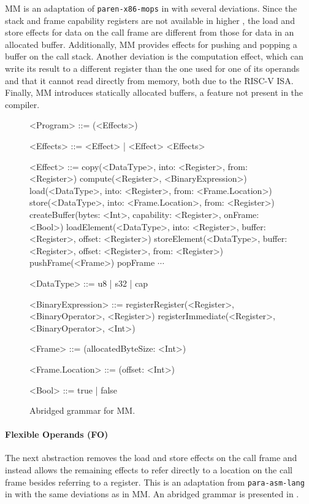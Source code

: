 \documentclass[main.tex]{subfiles}
\begin{document}
MM is an adaptation of \texttt{paren-x86-mops} in \cite{compcourse} with several deviations. Since the stack and frame capability registers are not available in higher \ils{}, the load and store effects for data on the call frame are different from those for data in an allocated buffer. Additionally, MM provides effects for pushing and popping a buffer on the call stack. Another deviation is the computation effect, which can write its result to a different register than the one used for one of its operands and that it cannot read directly from memory, both due to the RISC-V ISA. Finally, MM introduces statically allocated buffers, a feature not present in the \cite{compcourse} compiler.

\begin{figure}[ht]
	\small
	\begin{grammar}
		
		<Program> ::= (<Effects>)
		
		<Effects> ::= <Effect> | <Effect> <Effects>
		
		<Effect> ::= copy(<DataType>, into: <Register>, from: <Register>)
			\alt compute(<Register>, <BinaryExpression>)
			\alt load(<DataType>, into: <Register>, from: <Frame.Location>)
			\alt store(<DataType>, into: <Frame.Location>, from: <Register>)
			\alt createBuffer(bytes: <Int>, capability: <Register>, onFrame: <Bool>)
			\alt loadElement(<DataType>, into: <Register>, buffer: <Register>, offset: <Register>)
			\alt storeElement(<DataType>, buffer: <Register>, offset: <Register>, from: <Register>)
			\alt pushFrame(<Frame>)
			\alt popFrame
			\alt $\cdots$
		
		<DataType> ::= u8 | s32 | cap
		
		<BinaryExpression> ::= registerRegister(<Register>, <BinaryOperator>, <Register>)
			\alt registerImmediate(<Register>, <BinaryOperator>, <Int>)
		
		<Frame> ::= (allocatedByteSize: <Int>)
		
		<Frame.Location> ::= (offset: <Int>)
		
		<Bool> ::= true | false
		
	\end{grammar}
	\caption{Abridged grammar for MM.}
	\label{bnf:mm}
\end{figure}

\paragraph{Flexible Operands (FO)} The next abstraction removes the load and store effects on the call frame and instead allows the remaining effects to refer directly to a location on the call frame besides referring to a register. This is an adaptation from \texttt{para-asm-lang} in \cite{compcourse} with the same deviations as in MM. An abridged grammar is presented in .
\end{document}
